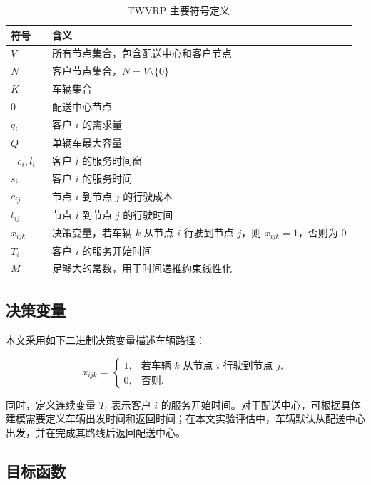 \documentclass[12pt,a4paper,UTF8]{article}
\begin{document}
\begin{table}[!htbp]
    \centering
    \caption{TWVRP 主要符号定义}
    \label{tab:twvrp_notation}
    \small
    \begin{tabularx}{\textwidth}{p{3.0cm} X}
        \toprule
        符号 & 含义 \\
        \midrule
        $V$ & 所有节点集合，包含配送中心和客户节点 \\
        $N$ & 客户节点集合，$N=V\setminus\{0\}$ \\
        $K$ & 车辆集合 \\
        $0$ & 配送中心节点 \\
        $q_i$ & 客户 $i$ 的需求量 \\
        $Q$ & 单辆车最大容量 \\
        $[e_i,l_i]$ & 客户 $i$ 的服务时间窗 \\
        $s_i$ & 客户 $i$ 的服务时间 \\
        $c_{ij}$ & 节点 $i$ 到节点 $j$ 的行驶成本 \\
        $t_{ij}$ & 节点 $i$ 到节点 $j$ 的行驶时间 \\
        $x_{ijk}$ & 决策变量，若车辆 $k$ 从节点 $i$ 行驶到节点 $j$，则 $x_{ijk}=1$，否则为 $0$ \\
        $T_i$ & 客户 $i$ 的服务开始时间 \\
        $M$ & 足够大的常数，用于时间递推约束线性化 \\
        \bottomrule
    \end{tabularx}
\end{table}

\subsection{决策变量}

本文采用如下二进制决策变量描述车辆路径：

\[
x_{ijk}=
\begin{cases}
1, & \text{若车辆 } k \text{ 从节点 } i \text{ 行驶到节点 } j,\\
0, & \text{否则}.
\end{cases}
\]

同时，定义连续变量 $T_i$ 表示客户 $i$ 的服务开始时间。对于配送中心，可根据具体建模需要定义车辆出发时间和返回时间；在本文实验评估中，车辆默认从配送中心出发，并在完成其路线后返回配送中心。

\subsection{目标函数}
\end{document}
